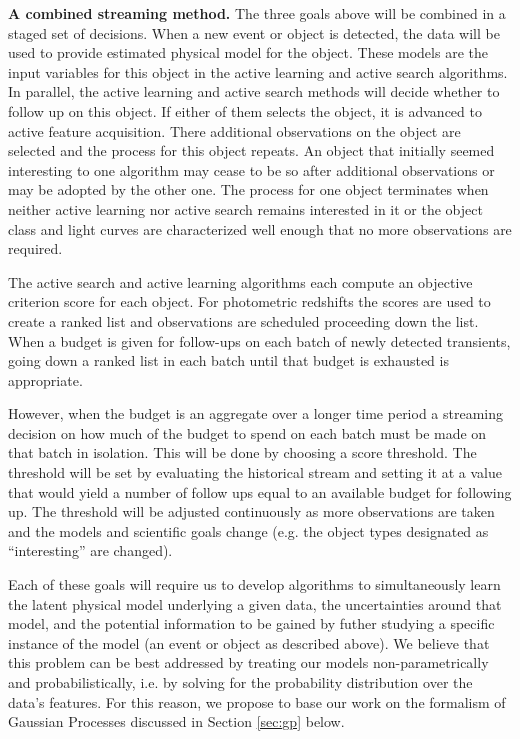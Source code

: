 \documentclass[useAMS,usenatbib,tightenlines,11pt,preprint]{aastex}
\begin{document}
{\bf A combined streaming method.} The three goals above will be combined
in a staged set of decisions.  When a new event or object is detected, the data
will be used to provide estimated physical model for the object.
These models are the input variables for this object in the active
learning and active search algorithms.  In parallel, the active learning
and active search methods will decide whether to follow up on this object.
If either of them selects the object, it is advanced to active feature
acquisition.  There additional observations on the object are selected and
the process for this object repeats.  An object that initially seemed
interesting to one algorithm may cease to be so after additional
observations or may be adopted by the other one.  The process for one
object terminates when neither active learning nor active search remains
interested in it or the object class and light curves are characterized
well enough that no more observations are required.

The active search and active learning algorithms each compute an objective
criterion score for each object.  For photometric redshifts the scores are
used to create a ranked list and observations are scheduled proceeding down
the list.  When a budget is given for follow-ups on each batch of newly
detected transients, going down a ranked list in each batch until that
budget is exhausted is appropriate.

However, when the budget is an aggregate over a longer time period a
streaming decision on how much of the budget to spend on each batch must be
made on that batch in isolation.  This will be done by choosing a score
threshold.  The threshold will be set by evaluating the historical stream
and setting it at a value that would yield a number of follow ups equal to
an available budget for following up.  The threshold will be adjusted
continuously as more observations are taken and the models and scientific
goals change (e.g. the object types designated as ``interesting'' are
changed).

Each of these goals will require us to develop algorithms to simultaneously
learn the latent physical model underlying a given data, the uncertainties
around that model, and the potential information to be gained by futher studying
a specific instance of the model (an event or object as described above).
We believe that this problem can be best addressed by treating our models
non-parametrically and probabilistically, 
i.e. by solving for the probability distribution over the data's features.
For this reason, we propose to base our work on the formalism of Gaussian
Processes discussed in Section \ref{sec:gp} below.
\end{document}
